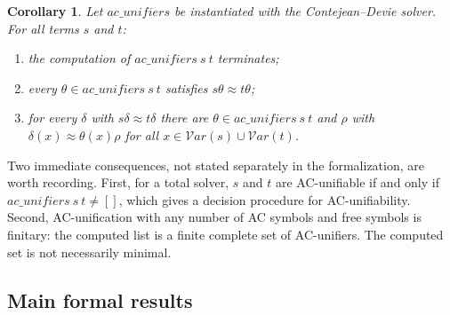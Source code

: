 \documentclass[11pt,a4paper]{article}
\newtheorem{corollary}[theorem]{Corollary}
\theoremstyle{definition}
\theoremstyle{remark}
\newcommand{\vars}{\mathcal{V}\mathit{ar}}
\newcommand{\eqAC}{\approx}
\begin{document}
\begin{corollary}
  Let $\mathit{ac\_unifiers}$ be instantiated with the Contejean--Devie solver. For all terms $s$
  and $t$:
  \begin{enumerate}[nosep]
    \item the computation of $\mathit{ac\_unifiers}\ s\ t$ terminates;
    \item every $\theta \in \mathit{ac\_unifiers}\ s\ t$ satisfies $s\theta \eqAC t\theta$;
    \item for every $\delta$ with $s\delta \eqAC t\delta$ there are
          $\theta \in \mathit{ac\_unifiers}\ s\ t$ and $\rho$ with $\delta(x) \eqAC \theta(x)\rho$
          for all $x \in \vars(s) \cup \vars(t)$.
  \end{enumerate}
\end{corollary}

Two immediate consequences, not stated separately in the formalization, are worth recording.
First, for a total solver, $s$ and $t$ are AC-unifiable if and only if
$\mathit{ac\_unifiers}\ s\ t \neq []$, which gives a decision procedure for AC-unifiability.
Second, AC-unification with any number of AC symbols and free symbols is finitary: the computed
list is a finite complete set of AC-unifiers. The computed set is not necessarily minimal.

\subsection{Main formal results}
\end{document}
